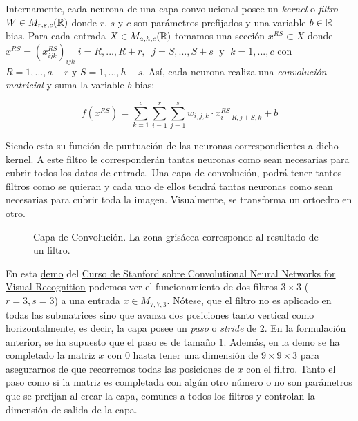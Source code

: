 Internamente, cada neurona de una capa convolucional posee un \emph{kernel} o \emph{filtro} $W\in M_{r,s,c}(\mathbb{R})$ donde $r$, $s$ y $c$ son parámetros prefijados y una variable $b\in\mathbb{R}$ bias. Para cada entrada $X \in M_{a,h,c}(\mathbb{R})$ tomamos una sección $x^{RS} \subset X$ donde $x^{RS}=(x_{ijk}^{RS})_{ijk}\; i=R,...,R+r, \;\; j=S,...,S+s\;$ y $\;k=1,...,c$ con $R=1,...,a-r$ y $S=1,...,h-s$. Así, cada neurona realiza una \emph{convolución matricial} y suma la variable $b$ bias: \newline

$$f(x^{RS})=\sum_{k=1}^{c}\sum_{i=1}^{r} \sum_{j=1}^{s} w_{i,j,k} \cdot x_{i+R,j+S,k}^{RS}+b$$

Siendo esta su función de puntuación de las neuronas correspondientes a dicho kernel. A este filtro le corresponderán tantas neuronas como sean necesarias para cubrir todos los datos de entrada. Una capa de convolución, podrá tener tantos filtros como se quieran y cada uno de ellos tendrá tantas neuronas como sean necesarias para cubrir toda la imagen. Visualmente, se transforma un ortoedro en otro.\newline

\begin{figure}
\centering


\caption{Capa de Convolución. La zona grisácea corresponde al resultado de un filtro. }
\label{fig:convolution}
\end{figure}

En esta \href{https://cs231n.github.io/assets/conv-demo/index.html}{demo} del \href{http://cs231n.stanford.edu/}{Curso de Stanford sobre Convolutional Neural Networks for Visual Recognition} podemos ver el funcionamiento de dos filtros $3\times 3$ ($r=3,s=3$) a una entrada $x\in M_{7,7,3}$. Nótese, que el filtro no es aplicado en todas las submatrices sino que avanza dos posiciones tanto vertical como horizontalmente, es decir, la capa posee un \emph{paso} o \emph{stride} de $2$. En la formulación anterior, se ha supuesto que el paso es de tamaño $1$. Además, en la demo se ha completado la matriz $x$ con $0$ hasta tener una dimensión de $9\times 9\times 3$ para asegurarnos de que recorremos todas las posiciones de $x$ con el filtro. Tanto el paso como si la matriz es completada con algún otro número o no son parámetros que se prefijan al crear la capa, comunes a todos los filtros y controlan la dimensión de salida de la capa.


